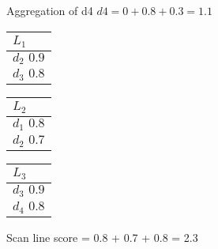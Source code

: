 Aggregation of d4 $d4 = 0 + 0.8 + 0.3 = 1.1$
 \begin{center}
    \begin{minipage}[t]{2cm}
        \begin{tabular}{|p{25pt}|}\hline
          $L_1$\\\hline
          $d_2 \, \, 0.9$\\\hline
          $d_3 \, \, 0.8$\\\hline
        \end{tabular}
    \end{minipage}
    \hspace{5mm}
    \begin{minipage}[t]{2cm}
        \begin{tabular}{|p{25pt}|}\hline
          $L_2$\\\hline
          $d_1 \, \, 0.8$\\\hline
          $d_2 \, \, 0.7$\\\hline
            \end{tabular}
    \end{minipage}
    \hspace{5mm}
    \begin{minipage}[t]{2cm}
        \begin{tabular}{|p{25pt}|}\hline
        $L_3$\\\hline
        $d_3 \, \, 0.9$\\\hline 
        $d_4 \, \, 0.8$\\\hline
        \end{tabular}
    \end{minipage}
    \end{center}

Scan line score = 0.8 + 0.7 + 0.8 = 2.3

